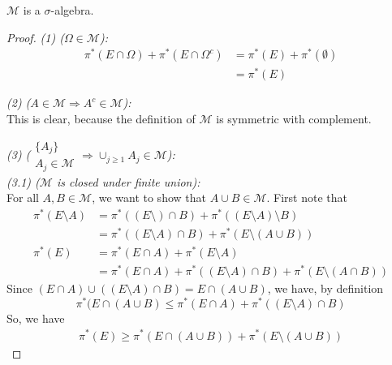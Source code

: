 \begin{fact}
  $\mathcal{M}$ is a $\sigma$-algebra.
\end{fact}
\begin{proof}
  \emph{(1) ($\Omega\in\mathcal{M}$):}\\
  \begin{align*}
    \pi^*(E\cap\Omega) + \pi^*(E\cap \Omega^c) &= \pi^*(E) + \pi^*(\emptyset) \\
                                               &= \pi^*(E)
  \end{align*}
  
  \emph{(2) ($A\in\mathcal{M}\Rightarrow A^c\in\mathcal{M}$):}\\
  This is clear, because the definition of $\mathcal{M}$ is symmetric with complement.
  
  \emph{(3) ($\substack{\{A_j\}\\A_j\in\mathcal{M}}\Rightarrow \cup_{j\geq 1} A_j \in \mathcal{M}$):}\\
  \emph{(3.1) ($\mathcal{M}$ is closed under finite union):}\\
  For all $A, B\in\mathcal{M}$, we want to show that $A\cup B\in \mathcal{M}$.
  First note that
  \begin{align*}
    \pi^*(E\setminus A) &= \pi^*((E\setminus)\cap B) + \pi^*((E\setminus A)\setminus B) \\
             &= \pi^*((E\setminus A)\cap B) + \pi^*(E\setminus (A\cup B)) \\
    \pi^*(E) &= \pi^*(E\cap A) + \pi^*(E\setminus A) \\
    &= \pi^*(E\cap A) + \pi^*((E\setminus A)\cap B) + \pi^*(E\setminus(A\cap B))
  \end{align*}
  Since $(E\cap A) \cup ((E\setminus A)\cap B) = E\cap(A\cup B)$,
  we have, by definition
  \[\pi^*(E\cap (A\cup B) \leq \pi^*(E\cap A) + \pi^*((E\setminus A)\cap B)\]
  So, we have
  \begin{align*}
    \pi^*(E) \geq \pi^*(E\cap(A\cup B)) + \pi^*(E\setminus(A\cup B))
  \end{align*}


\end{proof}
